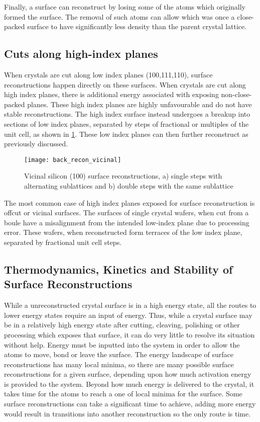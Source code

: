 Finally, a surface can reconstruct by losing some of the atoms which originally formed the surface. The removal of such atoms can allow which was once a close-packed surface to have significantly less density than the parent crystal lattice.

\subsection{Cuts along high-index planes}
When crystals are cut along low index planes (100,111,110), surface reconstructions happen directly on these surfaces. When crystals are cut along high index planes, there is additional energy associated with exposing non-close-packed planes. These high index planes are highly unfavourable and do not have stable reconstructions. The high index surface instead undergoes a breakup into sections of low index planes, separated by steps of fractional or multiples of the unit cell, as shown in \cref{fig:back_recon_vicinal}. These low index planes can then further reconstruct as previously discussed.
\begin{figure}
    \centering
    \texttt{[image: back\_recon\_vicinal]}
    \caption[Silicon single an double step surface reconstructions]{\label{fig:back_recon_vicinal}Vicinal silicon (100) surface reconstructions, a) single steps with alternating sublattices and b) double steps with the same sublattice\cite{Alerhand1990}}
\end{figure}

The most common case of high index planes exposed for surface reconstruction is offcut or vicinal surfaces. The surfaces of single crystal wafers, when cut from a boule have a misalignment from the intended low-index plane due to processing error. These wafers, when reconstructed form terraces of the low index plane, separated by fractional unit cell steps.

\subsection{Thermodynamics, Kinetics and Stability of Surface Reconstructions}
While a unreconstructed crystal surface is in a high energy state, all the routes to lower energy states require an input of energy. Thus, while a crystal surface may be in a relatively high energy state after cutting, cleaving, polishing or other processing which exposes that surface, it can do very little to resolve its situation without help. Energy must be inputted into the system in order to allow the atoms to move, bond or leave the surface. The energy landscape of surface reconstructions has many local minima, so there are many possible surface reconstructions for a given surface, depending upon how much activation energy is provided to the system. Beyond how much energy is delivered to the crystal, it takes time for the atoms to reach a one of local minima for the surface. Some surface reconstructions can take a significant time to achieve, adding more energy would result in transitions into another reconstruction so the only route is time.

